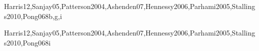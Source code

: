 \begin{syllabus}
\begin{unit}{\ARInterfacingandcommunication}{}{Harris12,Sanjay05,Patterson2004,Ashenden07,Hennessy2006,Parhami2005,Stallings2010,Pong06}{8}{b,g,i}
\begin{learningoutcomes}
	\item \ARInterfacingandcommunicationLOExplainHowUsed [\Familiarity]
	\item \ARInterfacingandcommunicationLOIdentifyVarious [\Familiarity]
	\item \ARInterfacingandcommunicationLODescribeData [\Usage]
	\item \ARInterfacingandcommunicationLOCompare [\Assessment]
	\item \ARInterfacingandcommunicationLOIdentifyThe [\Familiarity]
	\item \ARInterfacingandcommunicationLODescribeTheLimitations [\Familiarity]
\end{learningoutcomes}
\end{unit}

\begin{unit}{\ARMultiprocessingandalternativearchitectures}{}{Harris12,Sanjay05,Patterson2004,Ashenden07,Hennessy2006,Parhami2005,Stallings2010,Pong06}{8}{i}
\begin{topics}
	\item \ARMultiprocessingandalternativearchitecturesTopicPower
	\item \ARMultiprocessingandalternativearchitecturesTopicExample
	\item \ARMultiprocessingandalternativearchitecturesTopicInterconnection
	\item \ARMultiprocessingandalternativearchitecturesTopicShared
	\item \ARMultiprocessingandalternativearchitecturesTopicMultiprocessor
\end{topics}

\begin{learningoutcomes}
	\item \ARMultiprocessingandalternativearchitecturesLODiscussTheParallel [\Assessment]
	\item \ARMultiprocessingandalternativearchitecturesLODescribeAlternative [\Familiarity]
	\item \ARMultiprocessingandalternativearchitecturesLOExplainTheInterconnection [\Usage]
	\item \ARMultiprocessingandalternativearchitecturesLODiscussTheThat [\Familiarity]
	\item \ARMultiprocessingandalternativearchitecturesLODescribeTheMemoryMemory [\Assessment]
\end{learningoutcomes}
\end{unit}


\end{syllabus}
